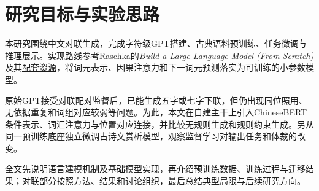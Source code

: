 \section{研究目标与实验思路}

本研究围绕中文对联生成，完成字符级GPT搭建、古典语料预训练、任务微调与推理展示。实现路线参考Raschka的\emph{Build a Large Language Model (From Scratch)}及其\href{https://github.com/rasbt/LLMs-from-scratch}{配套资源}\cite{raschka}，将词元表示、因果注意力和下一词元预测落实为可训练的小参数模型。

原始GPT接受对联配对监督后，已能生成五字或七字下联，但仍出现同位照用、无依据重复和词组对应较弱等问题。为此，本文在自建主干上引入ChineseBERT条件表示、词汇注意力与位置对应连接，并比较无规则生成和规则约束生成。另从同一预训练底座独立微调古诗文赏析模型，观察监督学习对输出任务和体裁的改变。

全文先说明语言建模机制及基础模型实现，再介绍预训练数据、训练过程与迁移结果；对联部分按照方法、结果和讨论组织，最后总结典型局限与后续研究方向。
